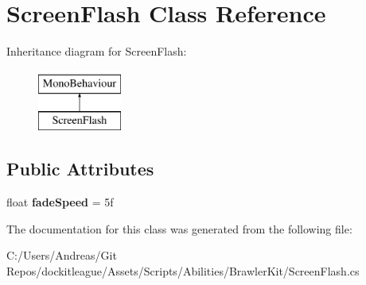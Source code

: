 \hypertarget{class_screen_flash}{}\section{Screen\+Flash Class Reference}
\label{class_screen_flash}
Inheritance diagram for Screen\+Flash\+:\begin{figure}[H]
\begin{center}
\leavevmode
\includegraphics[height=2.000000cm]{class_screen_flash}
\end{center}
\end{figure}
\subsection*{Public Attributes}
\begin{DoxyCompactItemize}
\item 
\hypertarget{class_screen_flash_a761366a97e07d3bc2daaf4229d14470d}{}\label{class_screen_flash_a761366a97e07d3bc2daaf4229d14470d} 
float {\bfseries fade\+Speed} = 5f
\end{DoxyCompactItemize}


The documentation for this class was generated from the following file\+:\begin{DoxyCompactItemize}
\item 
C\+:/\+Users/\+Andreas/\+Git Repos/dockitleague/\+Assets/\+Scripts/\+Abilities/\+Brawler\+Kit/Screen\+Flash.\+cs\end{DoxyCompactItemize}
